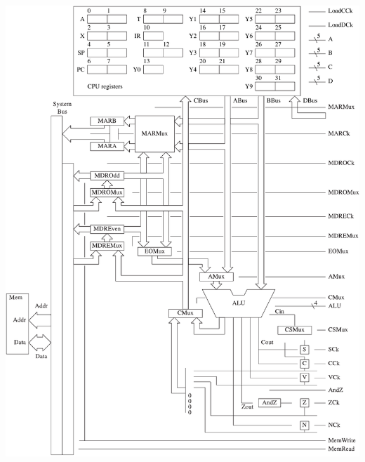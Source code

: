 \documentclass[10pt,fleqn]{book}
\begin{document}
\begin{center}
\includegraphics[scale=0.95]{pep10-2-byte-bus.pdf}
\end{center}
\end{document}
